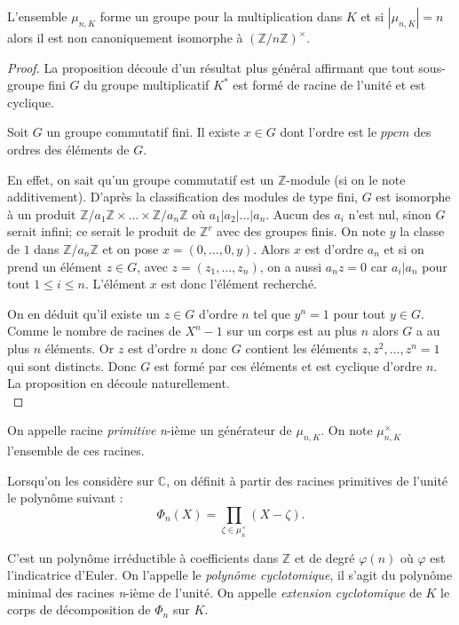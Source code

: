 \documentclass[a4paper]{article} %
\numberwithin{section}{part}
\numberwithin{equation}{section}
\newcommand\nroot[1]{\textit{#1}-ième}
\newcommand\zmodn[1]{\mathbb{Z}/#1\mathbb{Z}}
\newcommand\zmodninv[1]{(\mathbb{Z}/#1\mathbb{Z})^{\times}}
\newcommand\ZZ{\mathbb{Z}}
\newcommand\CC{\mathbb{C}}
\begin{document}
\begin{prop}
\label{prop:rootcycl}
L'ensemble $\mu_{n,K}$ forme un groupe pour la multiplication dans $K$ et si 
$|\mu_{n,K}| = n$ alors il est non canoniquement isomorphe à $\zmodninv{n}$.
\end{prop}
\begin{proof}
La proposition découle d'un résultat plus général affirmant que tout sous-groupe
fini $G$ du groupe multiplicatif $K^*$ est formé de racine de l'unité et est 
cyclique. 
\begin{lem}
Soit $G$ un groupe commutatif fini. Il existe $x\in G$ dont l'ordre est le 
$ppcm$ des ordres des éléments de $G$.
\end{lem}
En effet, on sait qu'un groupe commutatif est un $\ZZ$-module (si on le note 
additivement). D'après la classification des modules de type fini, $G$ est 
isomorphe à un produit $\zmodn{a_1}\times\dots\times\zmodn{a_n}$ où 
$a_1|a_2|\dots|a_n$. Aucun des $a_i$ n'est nul, sinon $G$ serait infini; 
ce serait le produit de $\ZZ^r$ avec des groupes finis. On note $y$ la classe 
de $1$ dans $\zmodn{a_n}$ et on pose $x = (0,\dots,0,y)$. Alors $x$ est d'ordre 
$a_n$ et si on prend un élément $z\in G$, avec $z = (z_1,\dots,z_n)$, on a aussi
$a_nz = 0$ car $a_i|a_n$ pour tout $1\leq i \leq n$. L'élément $x$ est donc
l'élément recherché.\par
On en déduit qu'il existe un $z\in G$ d'ordre $n$ tel que $y^n = 1$ pour 
tout $y\in G$. Comme le nombre de racines de $X^n - 1$ sur un corps est au plus 
$n$ alors $G$ a au plus $n$ éléments. Or $z$ est d'ordre $n$ donc $G$ contient 
les éléments $z, z^2,\dots,z^n = 1$ qui sont distincts. Donc $G$ est formé par 
ces éléments et est cyclique d'ordre $n$. La proposition en découle 
naturellement.\\
\end{proof}

\begin{defn}
On appelle racine \emph{primitive} \nroot{n} un générateur de $\mu_{n,K}$. On 
note $\mu_{n,K}^{\times}$ l'ensemble de ces racines.
\end{defn}

Lorsqu'on les considère sur $\CC$, on définit à partir des racines primitives de
l'unité le polynôme suivant :
\begin{equation}
\Phi_n(X) = \prod_{\zeta\in \mu_n^{\times}}{(X - \zeta)}.
\end{equation}

C'est un polynôme irréductible à coefficients dans $\ZZ$ \cite[prop 4.8]{Per}et 
de degré $\varphi(n)$ où $\varphi$ est l'indicatrice d'Euler. On l'appelle 
le \emph{polynôme cyclotomique}, il s'agit du polynôme minimal des racines
\nroot{n} de l'unité. On appelle \emph{extension cyclotomique} de $K$ le corps
de décomposition de $\Phi_n$ sur $K$.
\end{document}
